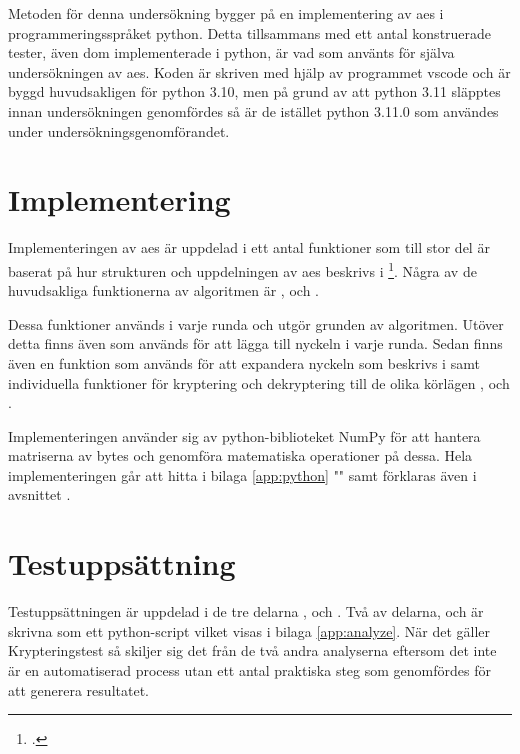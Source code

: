 Metoden för denna undersökning bygger på en implementering av \acrshort{aes} i programmeringsspråket
\gls{python}. Detta tillsammans med ett antal konstruerade tester, även dom implementerade i
\gls{python}, är vad som använts för själva undersökningen av \acrshort{aes}. Koden
är skriven med hjälp av programmet \gls{vscode} och är byggd huvudsakligen för \gls{python} 3.10, men
på grund av att \gls{python} 3.11 släpptes innan undersökningen genomfördes så är de istället \gls{python} 3.11.0
som användes under undersökningsgenomförandet.

\section{Implementering} %
Implementeringen av \acrshort{aes} är uppdelad i ett antal funktioner som till stor del är baserat på
hur strukturen och uppdelningen av \acrshort{aes} beskrivs i \footcite{daemen1999aes}.
Några av de huvudsakliga funktionerna av algoritmen är ,  och
.

Dessa funktioner används i varje runda och utgör grunden av algoritmen. Utöver detta finns
även  som används för att lägga till nyckeln i varje runda. Sedan finns även
en funktion som används för att expandera nyckeln som beskrivs i  samt
individuella funktioner för kryptering och dekryptering till de olika körlägen ,  och
.

Implementeringen använder sig av \gls{python}-biblioteket NumPy för att hantera matriserna av \gls{byte}s och genomföra
matematiska operationer på dessa. Hela implementeringen går att hitta i bilaga \ref{app:python} "" samt
förklaras även i avsnittet .

\section{Testuppsättning} %
Testuppsättningen är uppdelad i de tre delarna ,  och . Två av delarna,  och
 är skrivna som ett \gls{python}-script vilket visas i bilaga \ref{app:analyze}. När det gäller Krypteringstest så skiljer sig det från de två andra analyserna eftersom det
inte är en automatiserad process utan ett antal praktiska steg som genomfördes för att generera resultatet.

